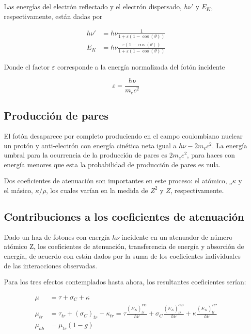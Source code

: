 \documentclass[12pt,letterpaper, oneside]{book}
\begin{document}
	 Las energías del electrón reflectado y el electrón dispersado, $h\nu'$ y $E_K$, respectivamente, están dadas por
	 
	 \begin{eqnarray}
	 	h\nu'&=h\nu \frac{1}{1+\varepsilon(1-\cos(\theta))}\\
	 	E_K&=h\nu \frac{\varepsilon(1-\cos(\theta))}{1+\varepsilon(1-\cos(\theta))}
	 \end{eqnarray} 
	 
	 Donde el factor $\varepsilon$ corresponde a la energía normalizada del fotón incidente
	 
	 $$\varepsilon=\frac{h\nu}{m_e c^2}$$
	 \subsection{Producción de pares} 
	 El fotón desaparece por completo produciendo en el campo coulombiano nuclear un protón y anti-electrón con energía cinética neta igual a $h\nu - 2m_ec^2$. La energía umbral para la ocurrencia de la producción de pares es $2m_ec^2$, para haces con energía menores que esta la probabilidad de producción de pares es nula\cite{IAEA.2005}. 
	 
	 Dos coeficientes de atenuación son importantes en este proceso: el atómico, $_a\kappa$ y el másico, $\kappa/\rho$, los cuales varían en la medida de $Z^2$ y $Z$, respectivamente. 
	 
	 \subsection{Contribuciones a los coeficientes de atenuación}
	 Dado un haz de fotones con energía $h\nu$ incidente en un atenuador de número atómico Z, los coeficientes de atenuación, transferencia de energía y absorción de energía, de acuerdo con \cite{IAEA.2005} están dados por la suma de los coeficientes individuales de las interacciones observadas.
	 
	 Para los tres efectos contemplados hasta ahora, los resultantes coeficientes serían:
	 
	 \begin{align}
	 	\mu&=\tau + \sigma_C + \kappa\\
	 	\mu_{tr}&=\tau_{tr} + (\sigma_C)_{tr}+\kappa_{tr}=\tau\frac{\left(\bar{E}_K\right)_{tr}^{PE}}{h\nu} + \sigma_C\frac{\left(\bar{E}_K\right)_{tr}^{CE}}{h\nu} + \kappa \frac{\left(\bar{E}_K\right)_{tr}^{PP}}{h\nu}\\
	 	\mu_{ab}&=\mu_{tr}(1-g)
	 \end{align}
	 
\end{document}
